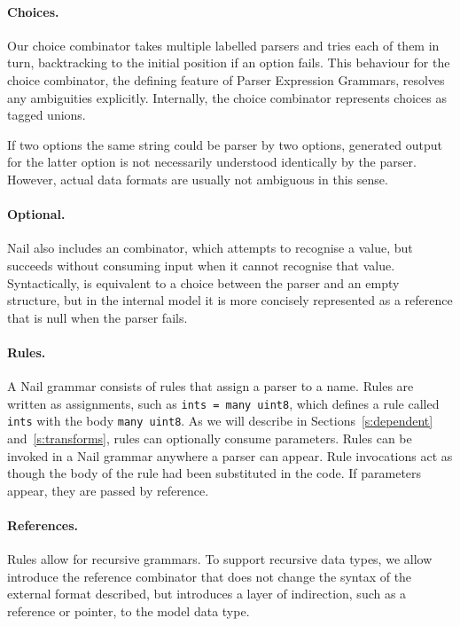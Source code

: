 \paragraph{Choices.}
Our choice combinator takes multiple labelled parsers and tries each of them in turn, backtracking
to the initial position if an option fails. This behaviour for the choice combinator, the defining
feature of Parser Expression Grammars\cite{ford2002packrat}, resolves any ambiguities explicitly.
Internally, the choice combinator represents choices as tagged unions. 

If two options the same string could be parser by two options, generated output for the latter
option is not necessarily understood identically by the parser. However, actual data formats are
usually not ambiguous in this sense.


\paragraph{Optional.}Nail also includes an  combinator, which attempts to recognise a value, but succeeds
without consuming input when it cannot recognise that value. Syntactically,  is
equivalent to a choice between the parser and an empty structure, but in the internal model it is
more concisely represented as a reference that is null when the parser fails.

\paragraph{Rules.}
A Nail grammar consists of rules that assign a parser to a name. Rules are written as
assignments, such as \texttt{ints = many uint8}, which defines a rule called \texttt{ints} with the
body \texttt{many uint8}.  As we will describe in Sections~\ref{s:dependent}
and~\ref{s:transforms}, rules can optionally consume parameters. 
Rules can be invoked in a Nail grammar anywhere a parser can appear. Rule invocations act as though
the body of the rule had been substituted in the code. If parameters appear, they are passed by reference.

\paragraph{References.}Rules allow for recursive grammars. To support recursive data types, we allow introduce the
reference combinator \cc{*}  that does not change the syntax of the external format described, but
introduces a layer of indirection, such as a reference or pointer, to the model data type.

